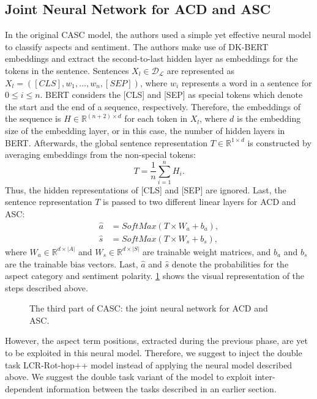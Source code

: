 \documentclass[american, oneside]{ecsgdp}
\begin{document}

\subsection{Joint Neural Network for ACD and ASC} %
In the original CASC model, the authors used a simple yet effective neural model to classify aspects and sentiment. The authors make use of DK-BERT embeddings and extract the second-to-last hidden layer as embeddings for the tokens in the sentence. Sentences $X_l \in \mathcal{D_\mathcal{L}}$ are represented as $X_l = \left ( [CLS], w_1, \ldots, w_n, [SEP] \right )$, where $w_i$ represents a word in a sentence for $0 \leq i \leq n$. BERT considers the [CLS] and [SEP] as special tokens which denote the start and the end of a sequence, respectively. Therefore, the embeddings of the sequence is $H \in \mathbb{R}^{(n+2) \times d}$ for each token in $X_l$, where $d$ is the embedding size of the embedding layer, or in this case, the number of hidden layers in BERT. Afterwards, the global sentence representation $T \in \mathbb{R}^{1 \times d}$ is constructed by averaging embeddings from the non-special tokens: 
\begin{equation} 
    T = \frac{1}{n} \sum_{i=1}^{n}H_i. 
\end{equation}
Thus, the hidden representations of [CLS] and [SEP] are ignored. Last, the sentence representation $T$ is passed to two different linear layers for ACD and ASC: 
\begin{align}
    \hat{a} & = SoftMax(T \times W_a + b_a), \\
    \hat{s} & = SoftMax(T \times W_s + b_s),
\end{align}
where $W_a \in \mathbb{R}^{d \times \lvert A \rvert}$ and $W_s \in \mathbb{R}^{d \times \lvert S \rvert}$ are trainable weight matrices, and $b_a$ and $b_s$ are the trainable bias vectors. Last, $\hat{a}$ and  $\hat{s}$ denote the probabilities for the aspect category and sentiment polarity. \cref{fig:simple_neural} shows the visual representation of the steps described above.
  

\begin{figure}[htbp]
  \centering
  
  \caption{The third part of CASC: the joint neural network for ACD and ASC.}
  \label{fig:simple_neural}
\end{figure}

However, the aspect term positions, extracted during the previous phase, are yet to be exploited in this neural model. Therefore, we suggest to inject the double task LCR-Rot-hop++ model instead of applying the neural model described above. We suggest the double task variant of the model to exploit inter-dependent information between the tasks described in an earlier section.
\end{document}
